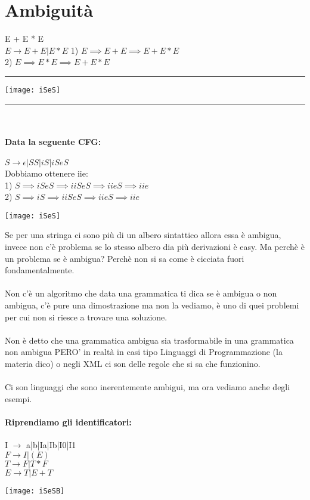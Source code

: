 \documentclass[12pt, a4paper, openany, oneside]{book}
\begin{document}
\section{Ambiguità}
E + E * E \\
$E \to E + E | E * E$
1) $E \implies E + E \implies E + E * E$ \\
2) $E \implies E * E \implies E + E * E$
\\
{\color{black} \rule{\linewidth}{0.3mm}}
\begin{center}
\texttt{[image: iSeS]}
\end{center}
{\color{black} \rule{\linewidth}{0.3mm}}
\\
\paragraph{Data la seguente CFG: } $S \to \epsilon|SS|iS|iSeS$ \\
Dobbiamo ottenere iie: \\
1) $S \implies iSeS \implies iiSeS \implies iieS \implies iie$ \\
2) $S \implies iS \implies iiSeS \implies iieS \implies iie$
\begin{center}
\texttt{[image: iSeS]}
\end{center}
Se per una stringa ci sono più di un albero sintattico allora essa è ambigua, 
invece non c'è problema se lo stesso albero dia più derivazioni è easy. Ma
perchè è un problema se è ambigua? Perchè non si sa come è cicciata fuori 
fondamentalmente.\\ \\
Non c'è un algoritmo che data una grammatica ti dica se è ambigua o non ambigua,
c'è pure una dimostrazione ma non la vediamo, è uno di quei problemi per cui
non si riesce a trovare una soluzione.\\ \\ Non è detto che una grammatica ambigua
sia trasformabile in una grammatica non ambigua PERO' in realtà in casi tipo 
Linguaggi di Programmazione (la materia dico) o negli XML ci son delle regole
che si sa che funzionino.\\ \\
Ci son linguaggi che sono inerentemente ambigui, ma ora vediamo anche degli esempi.
\paragraph{Riprendiamo gli identificatori: } I $\to$ a|b|Ia|Ib|I0|I1 \\
$F \to I | (E)$ \\
$T \to F | T * F$ \\
$E \to T | E + T$\\
\begin{center}
\texttt{[image: iSeSB]}
\end{center}
\end{document}
